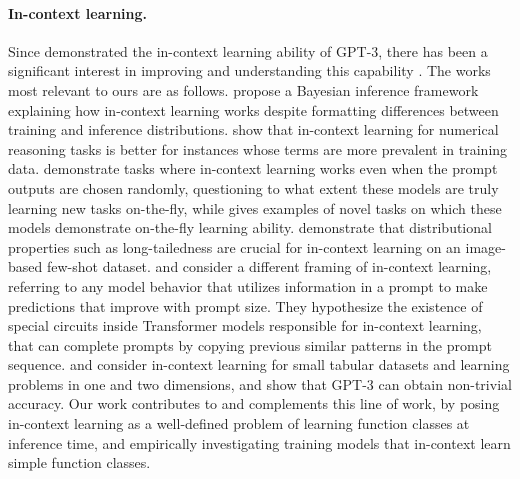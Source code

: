 \paragraph{In-context learning.} Since \citet{brown2020language} demonstrated the in-context learning ability of GPT-3, there has been a significant interest in improving and understanding this capability \citep{liu2021makes, min2021noisy, zhao2021calibrate, lu2021fantastically, rubin2021learning, min2021metaicl, chen2021meta, mishra2021reframing, lampinen2022can}.
The works most relevant to ours are as follows.
\citet{xie2022an} propose a Bayesian inference framework explaining how in-context learning works despite formatting differences between training and inference distributions. \citet{razeghi2022impact} show that in-context learning for numerical reasoning tasks is better for instances whose terms are more prevalent in training data. \citet{min2021noisy} demonstrate tasks where in-context learning  works  even when the prompt outputs are chosen randomly, questioning to what extent these models are truly  learning new tasks on-the-fly, while \citet{rong_2021} 
gives examples of novel tasks on which these models demonstrate on-the-fly learning ability. \citet{chan2022data} demonstrate that distributional properties such as long-tailedness are crucial for in-context learning on an image-based few-shot dataset. \citet{olsson2022context} and  \citet{elhage2021mathematical} consider a different framing of in-context learning, referring to any model behavior that utilizes information in a prompt to make predictions that improve with prompt size. They hypothesize the existence of special circuits inside Transformer models responsible for in-context learning, that can complete prompts by copying previous similar patterns in the prompt sequence. 
\citet{pesut2022who} and \citet[Table~16]{dinh2022lift} consider in-context learning for small tabular datasets and learning problems in one and two dimensions, and show that GPT-3 can obtain non-trivial accuracy.
Our work contributes to and complements this line of work, by posing in-context learning as a well-defined problem of learning function classes at inference time, and empirically investigating training models that in-context learn simple function classes.

